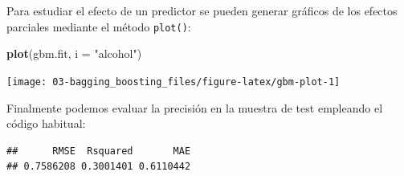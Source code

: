 \documentclass[
  spanish,
]{book}
\newenvironment{Shaded}{\begin{snugshade}}{\end{snugshade}}
\newcommand{\CommentTok}[1]{\textcolor[rgb]{0.56,0.35,0.01}{\textit{#1}}}
\newcommand{\DataTypeTok}[1]{\textcolor[rgb]{0.13,0.29,0.53}{#1}}
\newcommand{\KeywordTok}[1]{\textcolor[rgb]{0.13,0.29,0.53}{\textbf{#1}}}
\newcommand{\NormalTok}[1]{#1}
\newcommand{\OperatorTok}[1]{\textcolor[rgb]{0.81,0.36,0.00}{\textbf{#1}}}
\newcommand{\StringTok}[1]{\textcolor[rgb]{0.31,0.60,0.02}{#1}}
\theoremstyle{break}
\theoremstyle{definition}
\theoremstyle{definition}
\theoremstyle{definition}
\theoremstyle{remark}
\begin{document}
Para estudiar el efecto de un predictor se pueden generar gráficos de los efectos parciales mediante el método \texttt{plot()}:

\begin{Shaded}
\begin{Highlighting}[]
\KeywordTok{plot}\NormalTok{(gbm.fit, }\DataTypeTok{i =} \StringTok{"alcohol"}\NormalTok{)}
\end{Highlighting}
\end{Shaded}

\begin{center}\texttt{[image: 03-bagging\_boosting\_files/figure-latex/gbm-plot-1]} \end{center}

Finalmente podemos evaluar la precisión en la muestra de test empleando el código habitual:

\begin{Shaded}
\end{Shaded}

\begin{verbatim}
##      RMSE  Rsquared       MAE 
## 0.7586208 0.3001401 0.6110442
\end{verbatim}
\end{document}
